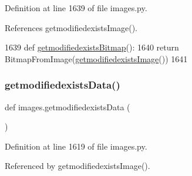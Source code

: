 Definition at line 1639 of file images.\+py.



References getmodifiedexists\+Image().


\begin{DoxyCode}
1639 \textcolor{keyword}{def }\hyperlink{namespaceimages_afba6dcd82696865e7718eb113495e9f5}{getmodifiedexistsBitmap}():
1640     \textcolor{keywordflow}{return} BitmapFromImage(\hyperlink{namespaceimages_ae65babb8d1bc2e6da9a094b09555867c}{getmodifiedexistsImage}())
1641 
\end{DoxyCode}
\mbox{\label{namespaceimages_aea5b717eed65e55064d892d751ee42a9}} 
\subsubsection{\texorpdfstring{getmodifiedexists\+Data()}{getmodifiedexistsData()}}
{\footnotesize\ttfamily def images.\+getmodifiedexists\+Data (\begin{DoxyParamCaption}{ }\end{DoxyParamCaption})}



Definition at line 1619 of file images.\+py.



Referenced by getmodifiedexists\+Image().


